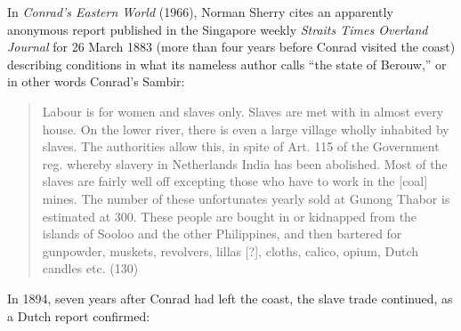 \documentclass[a4paper, 12pt]{article}
\begin{document}
In \textit{Conrad's Eastern World} (1966), Norman Sherry cites an apparently
anonymous report published in the Singapore weekly \textit{Straits Times
Overland Journal} for 26 March 1883 (more than four years before Conrad visited
the coast) describing conditions in what its nameless author calls ``the state
of Berouw,'' or in other words Conrad's Sambir:

\begin{quote}
Labour is for women and slaves only. Slaves are met with in almost every house.
On the lower river, there is even a large village wholly inhabited by slaves.
The authorities allow this, in spite of Art. 115 of the Government reg. whereby
slavery in Netherlands India has been abolished. Most of the slaves are fairly
well off excepting those who have to work in the [coal] mines. The number of
these unfortunates yearly sold at Gunong Thabor is estimated at 300. These
people are bought in or kidnapped from the islands of Sooloo and the other
Philippines, and then bartered for gunpowder, muskets, revolvers, lillas
[?], cloths, calico, opium, Dutch candles etc. (130)
\end{quote}

In 1894, seven years after Conrad had left the coast, the slave trade continued,
as a Dutch report confirmed:
\end{document}
